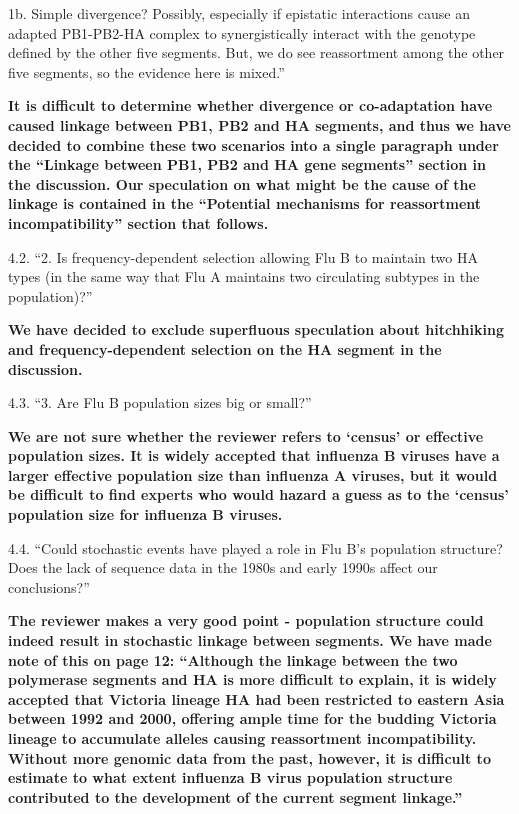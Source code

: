 \documentclass[11pt,oneside,letterpaper]{article}
\begin{document}
1b.  Simple divergence?
Possibly, especially if epistatic interactions cause an adapted PB1-PB2-HA complex to synergistically interact with the genotype defined by the other five segments.
But, we do see reassortment among the other five segments, so the evidence here is mixed.''

\textbf{It is difficult to determine whether divergence or co-adaptation have caused linkage between PB1, PB2 and HA segments, and thus we have decided to combine these two scenarios into a single paragraph under the ``Linkage between PB1, PB2 and HA gene segments'' section in the discussion.
Our speculation on what might be the cause of the linkage is contained in the ``Potential mechanisms for reassortment incompatibility'' section that follows.}

4.2. ``2. Is frequency-dependent selection allowing Flu B to maintain two HA types (in the same way that Flu A maintains two circulating subtypes in the population)?''

\textbf{We have decided to exclude superfluous speculation about hitchhiking and frequency-dependent selection on the HA segment in the discussion.}

4.3. ``3. Are Flu B population sizes big or small?''

\textbf{We are not sure whether the reviewer refers to `census' or effective population sizes.
It is widely accepted that influenza B viruses have a larger effective population size than influenza A viruses, but it would be difficult to find experts who would hazard a guess as to the `census' population size for influenza B viruses.}

4.4. ``Could stochastic events have played a role in Flu B's population structure?
Does the lack of sequence data in the 1980s and early 1990s affect our conclusions?''

\textbf{The reviewer makes a very good point - population structure could indeed result in stochastic linkage between segments.
We have made note of this on page 12:
``Although the linkage between the two polymerase segments and HA is more difficult to explain, it is widely accepted that Victoria lineage HA had been restricted to eastern Asia between 1992 and 2000, offering ample time for the budding Victoria lineage to accumulate alleles causing reassortment incompatibility.
Without more genomic data from the past, however, it is difficult to estimate to what extent influenza B virus population structure contributed to the development of the current segment linkage.''}
\end{document}
